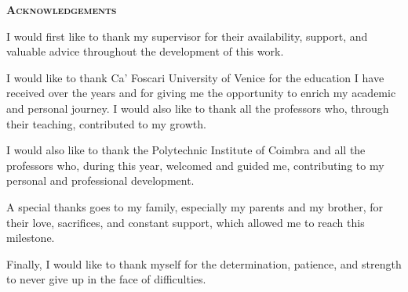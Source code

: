 

\vspace*{45pt}
\begin{flushleft}
	{\Large \textbf{\scshape{Acknowledgements}}}
\end{flushleft}
\vspace*{10pt}

I would first like to thank my supervisor for their availability, support, and valuable advice throughout the development of this work.

I would like to thank Ca' Foscari University of Venice for the education I have received over the years and for giving me the opportunity to enrich my academic and personal journey. I would also like to thank all the professors who, through their teaching, contributed to my growth.

I would also like to thank the Polytechnic Institute of Coimbra and all the professors who, during this year, welcomed and guided me, contributing to my personal and professional development.

A special thanks goes to my family, especially my parents and my brother, for their love, sacrifices, and constant support, which allowed me to reach this milestone.

Finally, I would like to thank myself for the determination, patience, and strength to never give up in the face of difficulties.

